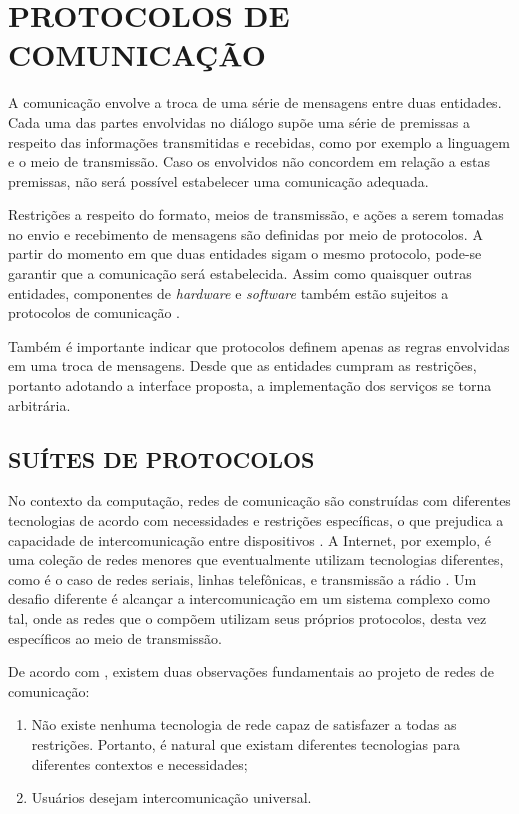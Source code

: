 \chapter{PROTOCOLOS DE COMUNICAÇÃO}

A comunicação envolve a troca de uma série de mensagens entre duas entidades. Cada
uma das partes envolvidas no diálogo supõe uma série de premissas a respeito das
informações transmitidas e recebidas, como por exemplo a linguagem e o meio de
transmissão. Caso os envolvidos não concordem em relação a estas premissas, não
será possível estabelecer uma comunicação adequada.

Restrições a respeito do formato, meios de transmissão, e ações a serem tomadas no
envio e recebimento de mensagens são definidas por meio de protocolos. A partir do
momento em que duas entidades sigam o mesmo protocolo, pode-se garantir que a
comunicação será estabelecida. Assim como quaisquer outras entidades, componentes de
\textit{hardware} e \textit{software} também estão sujeitos a protocolos de
comunicação \cite{kurose2012}.

Também é importante indicar que protocolos definem apenas as regras envolvidas em
uma troca de mensagens. Desde que as entidades cumpram as restrições, portanto
adotando a interface proposta, a implementação dos serviços se torna arbitrária.

\section{SUÍTES DE PROTOCOLOS}

No contexto da computação, redes de comunicação são construídas com diferentes
tecnologias de acordo com necessidades e restrições específicas, o que prejudica a
capacidade de intercomunicação entre dispositivos \cite{comer2000}. A Internet, por
exemplo, é uma coleção de redes menores que eventualmente utilizam tecnologias
diferentes, como é o caso de redes seriais, linhas telefônicas, e transmissão a
rádio \cite{tanenbaum2010}. Um desafio diferente é alcançar a intercomunicação em
um sistema complexo como tal, onde as redes que o compõem utilizam seus próprios
protocolos, desta vez específicos ao meio de transmissão.

De acordo com \cite{comer2000}, existem duas observações fundamentais ao projeto de
redes de comunicação:

\begin{enumerate}
  \item{Não existe nenhuma tecnologia de rede capaz de satisfazer a todas as
        restrições. Portanto, é natural que existam diferentes tecnologias para
        diferentes contextos e necessidades;}
  \item{Usuários desejam intercomunicação universal.}
\end{enumerate}

